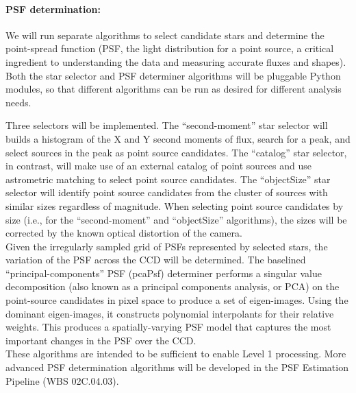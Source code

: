 \documentclass[12pt]{article}
\newcommand{\wbsPSF}{WBS 02C.04.03}
\begin{document}
\paragraph{PSF determination:} We will run separate algorithms to select candidate stars and determine the point-spread function (PSF, the light distribution for a point source, a critical ingredient to understanding the data and measuring accurate fluxes and shapes).  Both the star selector and PSF determiner algorithms will be pluggable Python modules, so that different algorithms can be run as desired for different analysis needs.

Three selectors will be implemented. %
The ``second-moment'' star selector will builds a histogram of the X and Y second moments of flux, search for a peak, and select sources in the peak as point source candidates.  The ``catalog'' star selector, in contrast, will make use of an external catalog of point sources and use astrometric matching to select point source candidates.  The ``objectSize'' star selector will identify point source candidates from the cluster of sources with similar sizes regardless of magnitude.  When selecting point source candidates by size (i.e., for the ``second-moment'' and ``objectSize'' algorithms), the sizes will be corrected by the known optical distortion of the camera.  %
\\

Given the irregularly sampled grid of PSFs represented by selected stars, the variation of the PSF across the CCD will be determined. The baselined ``principal-components'' PSF (pcaPsf) determiner performs a singular value decomposition (also known as a principal components analysis, or PCA) on the point-source candidates in pixel space to produce a set of eigen-images.  Using the dominant eigen-images, it constructs polynomial interpolants for their relative weights.  This produces a spatially-varying PSF model that captures the most important changes in the PSF over the CCD.
\\

These algorithms are intended to be sufficient to enable Level 1 processing. More advanced PSF determination algorithms will be developed in the PSF Estimation Pipeline (\wbsPSF).
\end{document}
